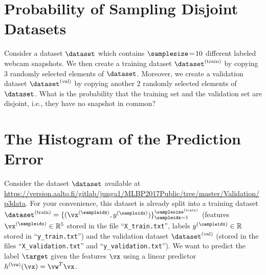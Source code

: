\documentclass[article,11pt]{article}
\begin{document}

\newpage

\section{Probability of Sampling Disjoint Datasets}
Consider a dataset $\dataset$ which contains $\samplesize\!=\!10$ different labeled webcam snapshots. We then create a 
training dataset $\dataset^{(\rm train)}$ by copying $3$ randomly selected elements of $\dataset$. Moreover, we create 
a validation dataset $\dataset^{(\rm val)}$ by copying another $2$ randomly selected elements of $\dataset$. 
What is the probability that the training set and the validation set are disjoint, i.e., they have no snapshot in common?


\newpage
\section{The Histogram of the Prediction Error} \label{problem 2}

Consider the dataset $\dataset$ available at \url{https://version.aalto.fi/gitlab/junga1/MLBP2017Public/tree/master/Validation/p3data}. 
For your convenience, this dataset is already split into a training dataset $\dataset^{(\rm train)}= \{ (\vx^{(\sampleidx)},y^{(\sampleidx)})\}_{\sampleidx=1}^{\samplesize^{(\rm train)}}$ 
(features $\vx^{(\sampleidx)} \in \mathbb{R}^{5}$ stored in the file ``\texttt{X\_train.txt}'', labels $y^{(\sampleidx)} \in \mathbb{R}$ stored in ``\texttt{y\_train.txt}'') 
and the validation dataset $\dataset^{(\rm val)}$ (stored in the files ``\texttt{X\_validation.txt}'' and  ``\texttt{y\_validation.txt}''). 
We want to predict the label $\target$ given the features $\vx$ using a linear predictor $h^{(\vw)}(\vx)=\vw^{T} \vx$.
\end{document}
